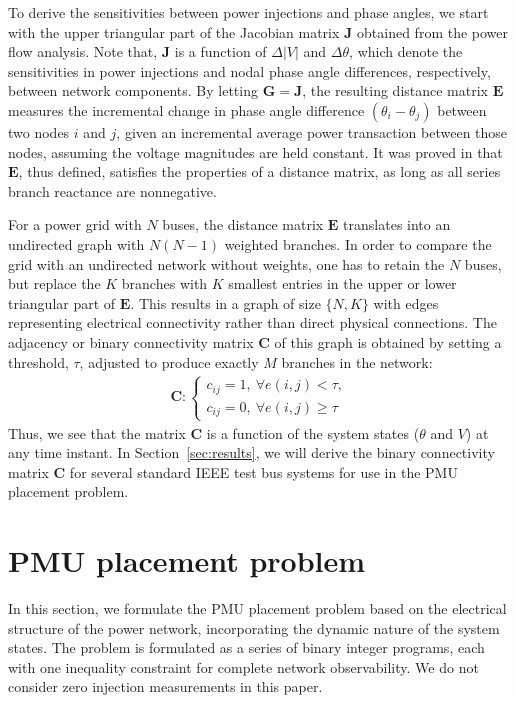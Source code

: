 \documentclass[10pt,journal,twocolumn]{IEEEtran}\IEEEoverridecommandlockouts
\newcommand{\secref}[1]{Section~\ref{#1}}
\begin{document}
To derive the sensitivities between power injections and phase angles, we start with the upper triangular part of the Jacobian matrix $\bm{J}$ obtained from the power flow analysis. Note that, $\bm{J}$ is a function of $\Delta |V|$ and $\Delta \theta$, which denote the sensitivities in power injections and nodal phase angle differences, respectively, between network components. By letting $\bm{G} = \bm{J}$, the resulting distance matrix $\bm{E}$ measures the incremental change in phase angle difference $(\theta_i - \theta_j)$ between two nodes $i$ and $j$, given an incremental average power transaction between those nodes, assuming the voltage magnitudes are held constant. It was proved in \cite[Appendix]{Cotilla-Sanchez2012} that $\bm{E}$, thus defined, satisfies the properties of a distance matrix, as long as all series branch reactance are nonnegative.

For a power grid with $N$ buses, the distance matrix $\bm{E}$ translates into an undirected graph with $N(N-1)$ weighted branches. In order to compare the grid with an undirected network without weights, one has to retain the $N$ buses, but replace the $K$ branches with $K$ smallest entries in the upper or lower triangular part of $\bm{E}$. This results in a graph of size $\{N,K\}$ with edges representing electrical connectivity rather than direct physical connections. The adjacency or binary connectivity matrix $\bm{C}$ of this graph is obtained by setting a threshold, $\tau$, adjusted to produce exactly $M$ branches in the network:
\begin{eqnarray}\label{eq:adjcency_matrix}
\bm{C}:
\begin{cases}
c_{ij} = 1, ~\forall e(i,j) < \tau,\\
c_{ij} = 0, ~\forall e(i,j) \geq \tau
\end{cases}
\end{eqnarray}
Thus, we see that the matrix $\bm{C}$ is a function of the system states ($\theta$ and $V$) at any time instant. In \secref{sec:results}, we will derive the binary connectivity matrix $\bm{C}$ for several standard IEEE test bus systems for use in the PMU placement problem.

\section{PMU placement problem}\label{sec:pmu_placement}
In this section, we formulate the PMU placement problem based on the electrical structure of the power network, incorporating the dynamic nature of the system states. The problem is formulated as a series of binary integer programs, each with one inequality constraint for complete network observability. We do not consider zero injection measurements in this paper.
\end{document}

